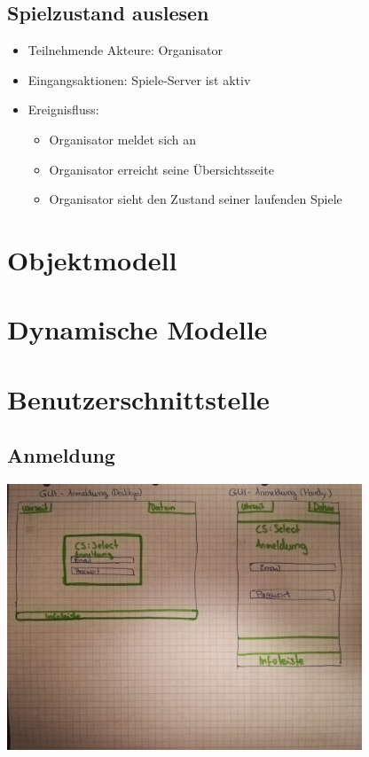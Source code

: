 \documentclass[a4paper]{scrreprt}
\begin{document}
	\subsection{Spielzustand auslesen}
	\begin{itemize}
		\item Teilnehmende Akteure: \Gls{Organisator}
		\item Eingangsaktionen: Spiele-Server ist aktiv
		\item Ereignisfluss:
		\begin{itemize}
			\item Organisator meldet sich an
			\item Organisator erreicht seine Übersichtsseite
			\item Organisator sieht den Zustand seiner laufenden Spiele
		\end{itemize}
	\end{itemize}

    \section{Objektmodell}

    \section{Dynamische Modelle}

    \section{Benutzerschnittstelle}

    \subsection{Anmeldung}
    \centering
    \includegraphics[width=400px]{../pictures/1_Anmeldung.jpg}
\end{document}
